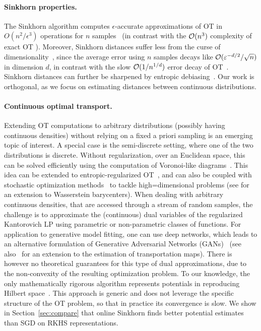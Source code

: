 \paragraph{Sinkhorn properties.} The Sinkhorn algorithm computes $\epsilon$-accurate
approximations of OT in $O(n^2/\epsilon^3)$ operations for $n$
samples~\citep{altschuler2017near} (in contrast with the $\mathcal{O}(n^3)$ complexity of exact OT \cite{goldberg1989finding}). Moreover, Sinkhorn distances suffer less from the
curse of dimensionality~\citep{2019-Genevay-aistats}, since the average error
using $n$ samples decays like $\mathcal{O}(\varepsilon^{-d/2}/\sqrt{n})$ in dimension
$d$, in contrast with the slow $\mathcal{O}(1/n^{1/d})$ error decay of
OT~\citep{dudley_speed_1969,weed2019sharp}. Sinkhorn distances can further be sharpened
by entropic debiasing~\citep{2019-Feydy-aistats}. Our work is orthogonal, as we focus on estimating distances between continuous distributions.

\paragraph{Continuous optimal transport.} Extending OT computations to arbitrary
distributions (possibly having continuous densities) without relying on a fixed
a priori sampling is an emerging topic of interest. A special case is the
semi-discrete setting, where one of the two distributions is discrete. Without
regularization, over an Euclidean space, this can be solved efficiently using
the computation of Voronoi-like diagrams~\citep{merigot2011multiscale}. This
idea can be extended to entropic-regularized OT~\citep{cuturi2018semidual}, and
can also be coupled with stochastic optimization
methods~\citep{2016-genevay-nips} to tackle high=dimensional problems (see
 \cite{staib2017parallel} for an extension to Wasserstein barycenters). When dealing with arbitrary continuous densities, that are accessed through a
stream of random samples, the challenge is to approximate  the (continuous) dual
variables of the regularized Kantorovich LP using parametric or non-parametric
classes of functions. For application to generative model fitting, one can use
deep networks, which leads to an alternative formulation of Generative
Adversarial Networks (GANs)~\citep{arjovsky2017wgan} (see
also~\citet{seguy2018large} for an extension to the estimation of transportation
maps). There is however no theoretical guarantees for this type of dual
approximations, due to the non-convexity of the resulting optimization problem.
To our knowledge, the only mathematically rigorous algorithm represents potentials in reproducing
Hilbert space~\citep{2016-genevay-nips}. This
approach is generic and does not leverage the specific structure of the OT problem, so that in practice its convergence is slow. We show in Section~\autoref{sec:compare} that online Sinkhorn finds better potential estimates than SGD on RKHS representations.

